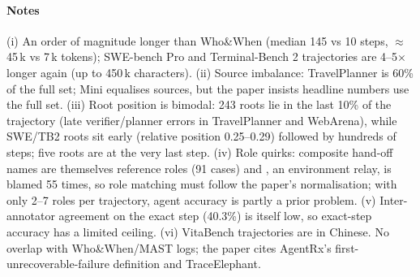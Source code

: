 \paragraph{Notes} (i) An order of magnitude longer than Who\&When (median 145 vs 10 steps, $\approx$45\,k vs 7\,k tokens); SWE-bench Pro and Terminal-Bench 2 trajectories are 4--5$\times$ longer again (up to 450\,k characters). (ii) Source imbalance: TravelPlanner is 60\% of the full set; Mini equalises sources, but the paper insists headline numbers use the full set. (iii) Root position is bimodal: 243 roots lie in the last 10\% of the trajectory (late verifier/planner errors in TravelPlanner and WebArena), while SWE/TB2 roots sit early (relative position 0.25--0.29) followed by hundreds of steps; five roots are at the very last step. (iv) Role quirks: composite hand-off names are themselves reference roles (91 cases) and , an environment relay, is blamed 55 times, so role matching must follow the paper's normalisation; with only 2--7 roles per trajectory, agent accuracy is partly a prior problem. (v) Inter-annotator agreement on the exact step (40.3\%) is itself low, so exact-step accuracy has a limited ceiling. (vi) VitaBench trajectories are in Chinese. No overlap with Who\&When/MAST logs; the paper cites AgentRx's first-unrecoverable-failure definition and TraceElephant.
